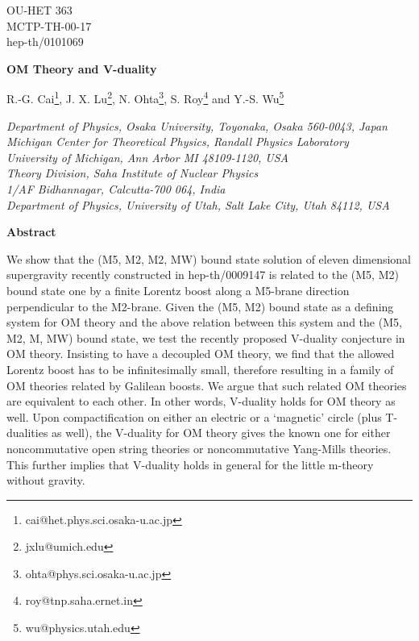 \documentclass[a4paper,12pt]{article}
\begin{document}
\topmargin 0pt
\oddsidemargin 0mm

\renewcommand{\thefootnote}{\fnsymbol{footnote}}
\begin{titlepage}
\begin{flushright}
OU-HET 363\\
MCTP-TH-00-17\\
hep-th/0101069
\end{flushright}
\begin{center}
{\Large \bf  OM Theory and V-duality} 
\vspace{2mm} 
\begin{center}
{\large R.-G. Cai\footnote{cai@het.phys.sci.osaka-u.ac.jp},
        J. X. Lu\footnote{jxlu@umich.edu},
N. Ohta\footnote{ohta@phys.sci.osaka-u.ac.jp},
 S. Roy\footnote{roy@tnp.saha.ernet.in}
and Y.-S. Wu\footnote{wu@physics.utah.edu}\\}
\vspace{2mm}

{\em \myHighlight{$^\ast$}\coordHE{}  \myHighlight{$^\ddagger$}\coordHE{}Department of Physics, Osaka University,
 Toyonaka, Osaka 560-0043, Japan\\
\myHighlight{$^\dagger$}\coordHE{}Michigan Center for Theoretical Physics, Randall Physics
 Laboratory\\
 University of Michigan, Ann Arbor MI 48109-1120, USA\\
\myHighlight{$^\S$}\coordHE{}Theory Division, Saha Institute of Nuclear Physics\\
 1/AF Bidhannagar, Calcutta-700 064, India \\
\myHighlight{$^\P$}\coordHE{} Department of Physics, University of Utah, Salt Lake City, Utah 84112,
   USA}
\end{center}
\end{center}

\vspace{4mm}
\centerline{{\bf{Abstract}}}
\vspace{2mm}
\begin{small}
We show that the (M5, M2, M2\coordHE{}, MW) bound state solution of eleven 
dimensional supergravity  recently constructed in
hep-th/0009147 is related to  the (M5, M2) bound state one by a 
finite Lorentz boost along a M5-brane direction perpendicular to the 
M2-brane.  Given the (M5, M2) bound state as a defining system for OM 
theory and the above relation between this system and the 
(M5, M2, M\coordHE{}, MW) bound state, we test the recently proposed V-duality 
conjecture in OM theory. Insisting to have a decoupled OM theory, we
find that the allowed Lorentz boost has to be infinitesimally small, 
therefore resulting in a family of OM theories related by  Galilean boosts. 
We argue that such related OM theories are equivalent to each other.
In other words,  V-duality holds for OM theory as well. Upon compactification
on either an electric or a `magnetic' circle (plus T-dualities as well),
the V-duality for OM theory gives the known one for either 
noncommutative open string theories or noncommutative Yang-Mills
theories. This further implies that V-duality holds in general for 
the little m-theory without gravity.
\end{small}


\end{titlepage}
\end{document}
